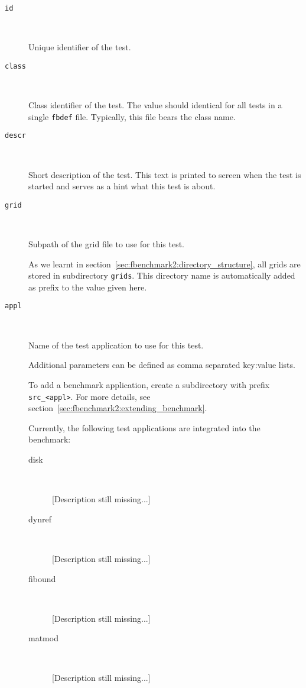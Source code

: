 \begin{description}
\item[\texttt{id}] \

  Unique identifier of the test.

\item[\texttt{class}] \

  Class identifier of the test. The value should identical for all tests in
  a single \texttt{fbdef} file. Typically, this file bears the class name.

\item[\texttt{descr}]  \

  Short description of the test. This text is printed to screen when the test is
  started and serves as a hint what this test is about.

\item[\texttt{grid}]  \

  Subpath of the grid file to use for this test.

  As we learnt in
  section~\ref{sec:fbenchmark2:directory_structure}, all grids are stored in
  subdirectory \texttt{grids}. This directory name is automatically added as
  prefix to the value given here.

\item[\texttt{appl}]  \

  Name of the test application to use for this test.

  Additional parameters can be defined as comma separated key:value lists.

  To add a benchmark application, create a subdirectory with prefix
  \texttt{src\_<appl>}. For more details, see section~\ref{sec:fbenchmark2:extending_benchmark}.

  Currently, the following test applications are integrated into the benchmark:
  \begin{description}
  \item[disk] \

    [Description still missing...]

  \item[dynref] \

    [Description still missing...]

  \item[fibound] \

    [Description still missing...]

  \item[matmod] \

    [Description still missing...]


\end{description}
\end{description}

